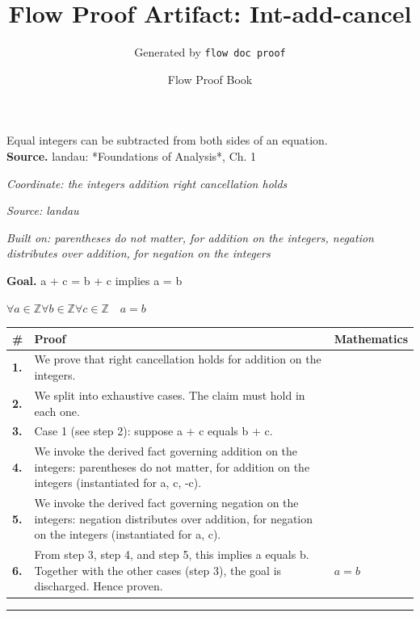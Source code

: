 \documentclass[11pt]{article}
\title{Flow Proof Artifact: Int-add-cancel}
\author{Generated by \texttt{flow doc proof}}
\date{Flow Proof Book}
\theoremstyle{definition}
\begin{document}
\maketitle
Equal integers can be subtracted from both sides of an equation.\\[0.5em]
\textbf{Source.} landau: *Foundations of Analysis*, Ch. 1\\[0.5em]
\bigskip
{}\par
\smallskip\noindent\textit{Coordinate: the integers \cdot addition \cdot right cancellation holds}\par
\smallskip\noindent\textit{Source: landau}\par
\smallskip\noindent\textit{Built on: parentheses do not matter, for addition on the integers, negation distributes over addition, for negation on the integers}\par
\medskip
\noindent\textbf{Goal.} a + c = b + c implies a = b\par
\noindent$\displaystyle \forall a \in \mathbb{Z} \forall b \in \mathbb{Z} \forall c \in \mathbb{Z}\quad a = b$\par
\medskip
\noindent
\begin{tabular}{@{} >{\raggedright\arraybackslash}p{} >{\raggedright\arraybackslash}p{} >{\raggedleft\arraybackslash}p{} @{}}
\textbf{\#} & \textbf{Proof} & \textbf{Mathematics} \\
\midrule
\textbf{1.} & We prove that right cancellation holds for addition on the integers. & \\[0.45em]
\textbf{2.} & We split into exhaustive cases. The claim must hold in each one. & \\[0.45em]
\textbf{3.} & Case 1 (see step 2): suppose a + c  equals  b + c. & \\[0.45em]
\textbf{4.} & We invoke the derived fact governing addition on the integers: parentheses do not matter, for addition on the integers (instantiated for a, c, -c). & \\[0.45em]
\textbf{5.} & We invoke the derived fact governing negation on the integers: negation distributes over addition, for negation on the integers (instantiated for a, c). & \\[0.45em]
\textbf{6.} & From step 3, step 4, and step 5, this implies a equals b. Together with the other cases (step 3), the goal is discharged. Hence proven. & $\displaystyle a = b$ \\[0.45em]
\bottomrule
\end{tabular}
\label{thm:Int-addition-right_cancellation_holds}
\par\medskip\hrule
\end{document}
